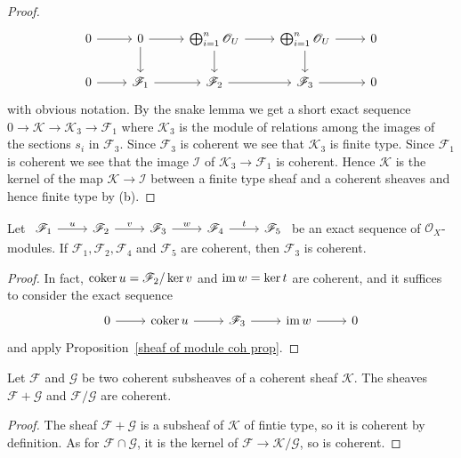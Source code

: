 \begin{proof}
\[\begin{tikzcd}
0\ar[r]&0\ar[r]\ar[d]&\bigoplus_{i=1}^{n}\mathscr{O}_U\ar[d]\ar[r]&\bigoplus_{i=1}^{n}\mathscr{O}_U\ar[r]\ar[d]&0\\
0\ar[r]&\mathscr{F}_1\ar[r]&\mathscr{F}_2\ar[r]&\mathscr{F}_3\ar[r]&0
\end{tikzcd}\]
with obvious notation. By the snake lemma we get a short exact sequence $0\to\mathscr{K}\to\mathscr{K}_3\to\mathscr{F}_1$ where $\mathscr{K}_3$ is the module of relations among the images of the sections $s_i$ in $\mathscr{F}_3$. Since $\mathscr{F}_3$ is coherent we see that $\mathscr{K}_3$ is finite type. Since $\mathscr{F}_1$ is coherent we see that the image $\mathscr{I}$ of $\mathscr{K}_3\to\mathscr{F}_1$ is coherent. Hence $\mathscr{K}$ is the kernel of the map $\mathscr{K}\to\mathscr{I}$ between a finite type sheaf and a coherent sheaves and hence finite type by (b).
\end{proof}
\begin{corollary}\label{sheaf of module coh 5 of 4}
Let $\begin{tikzcd}\mathscr{F}_1\ar[r,"u"]&\mathscr{F}_2\ar[r,"v"]&\mathscr{F}_3\ar[r,"w"]&\mathscr{F}_4\ar[r,"t"]&\mathscr{F}_5\end{tikzcd}$ be an exact sequence of $\mathscr{O}_X$-modules. If $\mathscr{F}_1,\mathscr{F}_2,\mathscr{F}_4$ and $\mathscr{F}_5$ are coherent, then $\mathscr{F}_3$ is coherent.
\end{corollary}
\begin{proof}
In fact, $\operatorname{coker} u=\mathscr{F}_2/\operatorname{ker} v$ and $\operatorname{im} w=\operatorname{ker} t$ are coherent, and it suffices to consider the exact sequence
\[\begin{tikzcd}
0\ar[r]&\coker u\ar[r]&\mathscr{F}_3\ar[r]&\im w\ar[r]&0
\end{tikzcd}\]
and apply Proposition~\ref{sheaf of module coh prop}.
\end{proof}
\begin{corollary}\label{sheaf of module coh sum and quotient}
Let $\mathscr{F}$ and $\mathscr{G}$ be two coherent subsheaves of a coherent sheaf $\mathscr{K}$. The sheaves $\mathscr{F}+\mathscr{G}$ and $\mathscr{F}/\mathscr{G}$ are coherent.
\end{corollary}
\begin{proof}
The sheaf $\mathscr{F}+\mathscr{G}$ is a subsheaf of $\mathscr{K}$ of fintie type, so it is coherent by definition. As for $\mathscr{F}\cap\mathscr{G}$, it is the kernel of $\mathscr{F}\to\mathscr{K}/\mathscr{G}$, so is coherent.
\end{proof}
